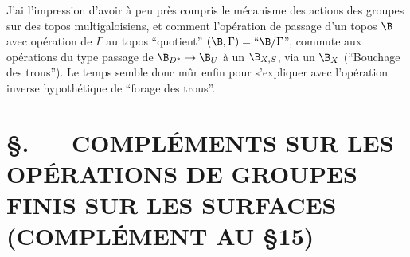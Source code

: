 J'ai l'impression d'avoir à peu près compris le mécanisme des actions des groupes sur des topos multigaloisiens, et comment l'opération de passage d'un topos $\B$ avec opération de $\Gamma$ au topos ``quotient'' $(\B, \Gamma) = ``\B/\Gamma$'', commute aux opérations du type passage de $\B_{D^*} \to \B_U$ à un $\B_{X,S}$, via un $\B_X$ (``Bouchage des trous''). Le temps semble donc mûr enfin pour s'expliquer avec l'opération inverse hypothétique de ``forage des trous''.
 












\chapter*{\S {}. --- COMPLÉMENTS SUR LES OPÉRATIONS DE GROUPES FINIS SUR LES SURFACES \\ (COMPLÉMENT AU \S 15)}\thispagestyle{empty}
\label{sec:17}
\section*{}


